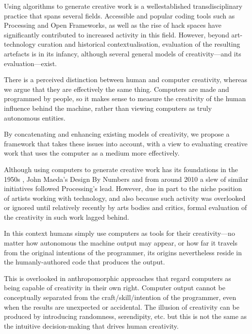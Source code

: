 \begin{leftbar}
Using algorithms to generate creative work is a wellestablished transdisciplinary practice that spans several fields. Accessible and popular coding tools such as Processing and Open Frameworks, as well as the rise of hack spaces have significantly contributed to increased activity in this field. However, beyond art-technology curation and historical contextualisation, evaluation of the resulting artefacts is in its infancy, although several general models of creativity---and its evaluation---exist.

There is a perceived distinction between human and computer creativity, whereas we argue that they are effectively the same thing. Computers are made and programmed by people, so it makes sense to measure the creativity of the human influence behind the machine, rather than viewing computers as truly autonomous entities.

By concatenating and enhancing existing models of creativity, we propose a framework that takes these issues into account, with a view to evaluating creative work that uses the computer as a medium more effectively.

\spirals

Although using computers to generate creative work has its foundations in the 1950s \autocite{Candy2011}, John Maeda's Design By Numbers \autocite{Maeda2001} and from around 2010 a slew of similar initiatives followed Processing's lead. However, due in part to the niche position of artists working with technology, and also because such activity was overlooked or ignored until relatively recently by arts bodies and critics, formal evaluation of the creativity in such work lagged behind.

In this context humans simply use computers as tools for their creativity---no matter how autonomous the machine output may appear, or how far it travels from the original intentions of the programmer, its origins nevertheless reside in the humanly-authored code that produces the output.

This is overlooked in anthropomorphic approaches that regard computers as being capable of creativity in their own right. Computer output cannot be conceptually separated from the craft/skill/intention of the programmer, even when the results are unexpected or accidental. The illusion of creativity can be produced by introducing randomness, serendipity, etc. but this is not the same as the intuitive decision-making that drives human creativity.


\end{leftbar}
